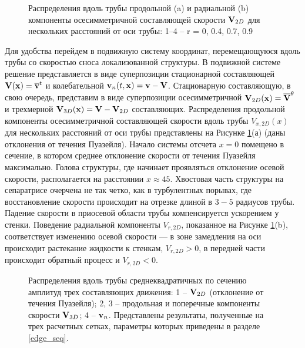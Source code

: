 \begin{figure}
\caption{Распределения вдоль трубы продольной (a) и радиальной (b) компоненты осесимметричной составляющей скорости $\mathbf{V}_{2D}$ для нескольких расстояний от оси трубы: 1–4 – r = 0, 0.4, 0.7, 0.9}
\label{U2D_pic}
\end{figure}

Для удобства перейдем в подвижную систему координат, перемещающуюся вдоль трубы со скоростью сноса локализованной структуры. В подвижной системе решение представляется в виде суперпозиции стационарной составляющей $\mathbf{V}(\mathbf{x}) = \overline{\mathbf{v}}^t$ и колебательной $\mathbf{v}_n(t,\mathbf{x}) = \mathbf{v} - \mathbf{V}$. Стационарную составляющую, в свою очередь, представим в виде суперпозиции осесимметричной $\mathbf{V}_{2D}(\mathbf{x}) = \overline{\mathbf{V}}^{\theta}$ и трехмерной $\mathbf{V}_{3D}(\mathbf{x}) = \mathbf{V} - \mathbf{V}_{2D}$ составляющих. Распределения продольной компоненты осесимметричной составляющей скорости вдоль трубы $V_{x,2D}(x)$ для нескольких расстояний от оси трубы представлены на Рисунке \ref{U2D_pic}(а) (даны отклонения от течения Пуазейля). Начало системы отсчета $x=0$ помещено в сечение, в котором среднее отклонение скорости от течения Пуазейля максимально. Голова структуры, где начинает проявляться отклонение осевой скорости, располагается на расстоянии $x \approx 45$. Хвостовая часть структуры на сепаратрисе очерчена не так четко, как в турбулентных порывах, где восстановление скорости происходит на отрезке длиной в $3-5$ радиусов трубы.  Падение скорости в приосевой области трубы компенсируется ускорением у стенки. Поведение радиальной компоненты $V_{r,2D}$, показанное на Рисунке \ref{U2D_pic}(b), соответствует изменению осевой скорости --- в зоне замедления на оси происходит растекание жидкости к стенкам, $V_{r,2D}>0$, в передней части происходит обратный процесс и $V_{r,2D}<0$.

\begin{figure}
\caption{Распределения вдоль трубы среднеквадратичных по сечению амплитуд трех составляющих движения: 1 -- $\mathbf{V}_{2D}$ (отклонение от течения Пуазейля); 2, 3 -- продольная и поперечные компоненты скорости $\mathbf{V}_{3D}$; 4 -- $\mathbf{v}_{n}$. Представлены результаты, полученные на трех расчетных сетках, параметры которых приведены в разделе \ref{edge_seq}. }
\label{amp_pic}
\end{figure}

